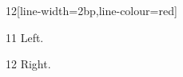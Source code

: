 \documentclass[paper=A4]{ropas-poster}
\begin{document}
\begin{postergrid}{1}{2}[line-width=2bp,line-colour=red]
\begin{posterblock}{1}{1}
Left.
\end{posterblock}
\begin{posterblock}{1}{2}
Right.
\end{posterblock}
\end{postergrid}
\end{document}

